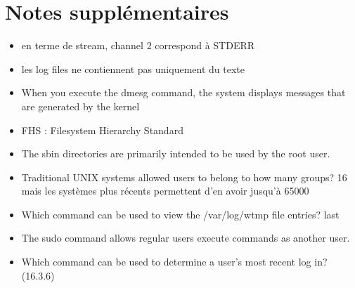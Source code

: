 \documentclass{article}
\begin{document}
\section{Notes supplémentaires}
\begin{itemize}
	\item en terme de stream, channel 2 correspond à STDERR
    \item les log files ne contiennent pas uniquement du texte
    \item When you execute the dmesg command, the system displays messages that are generated by the kernel
    \item FHS : Filesystem Hierarchy Standard
    \item The sbin directories are primarily intended to be used by the root user.
    \item Traditional UNIX systems allowed users to belong to how many groups? 16 mais les systèmes plus récents permettent d'en avoir jusqu'à 65000
    \item Which command can be used to view the /var/log/wtmp file entries? last
    \item The sudo command allows regular users execute commands as another user.
    \item Which command can be used to determine a user's most recent log in? (16.3.6)
\end{itemize}
\end{document}
